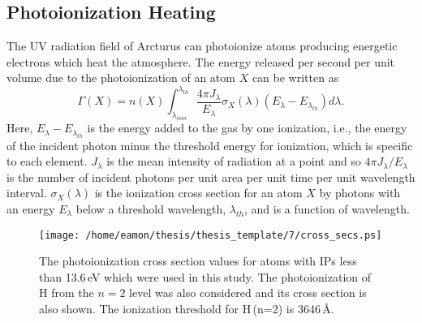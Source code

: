 \subsection{Photoionization Heating}\label{sec:7.4.1}
The UV radiation field of Arcturus can photoionize atoms producing energetic electrons which heat the atmosphere. The energy released per second per unit volume due to the photoionization of an atom $X$ can be written as
\begin{equation}\label{eq:7.20}
\Gamma (X) = n(X)\int ^{\lambda _{th}}_{\lambda _{min}}\frac{4\pi J_{\lambda}}{E _{\lambda}}\sigma _{X}(\lambda)(E_{\lambda} - E_{\lambda _{th}})d\lambda .
\end{equation}
Here, $E_{\lambda} - E_{\lambda _{th}}$ is the energy added to the gas by one ionization, i.e., the energy of the incident photon minus the threshold energy for ionization, which is specific to each element. $J_{\lambda}$ is the 
mean intensity of radiation at a point and so $4\pi J_{\lambda}/E _{\lambda}$ is the number of incident photons per unit area per unit time per unit wavelength interval. $\sigma _{X}(\lambda)$ is the ionization cross section for an atom $X$ by photons with an energy $E_{\lambda}$ below a threshold wavelength, $\lambda _{th}$, and is a function of wavelength.

\begin{figure}[!ht]
\centering 
         \texttt{[image: /home/eamon/thesis/thesis\_template/7/cross\_secs.ps]}
\caption[]{The photoionization cross section values for atoms with IPs less than 13.6\,eV which were used in this study. The photoionization of H from the $n=2$ level was also considered and its cross section is also shown. The ionization threshold for H\,(n=2) is 3646\,\AA .}
\label{fig:7.3}
\end{figure}

